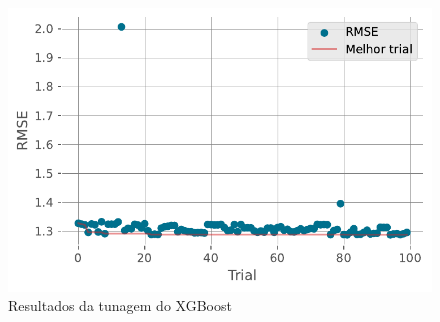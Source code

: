 \documentclass[
  12pt,
  a4paper,
]{scrreprt}
\begin{document}
\begin{figure}
\begin{minipage}{0.33\linewidth}
{\captionsetup{labelsep=none}\includegraphics{TCC_files/figure-pdf/fig-xgb_history-output-1.pdf}

}

\subcaption{\label{fig-xgb_history}}

\end{minipage}%
\newline
\begin{minipage}{\linewidth}


\subcaption{\label{fig-xgb_contour}}

\end{minipage}%

\caption{\label{fig-xgb_param}Resultados da tunagem do XGBoost}

\end{figure}%
\end{document}
